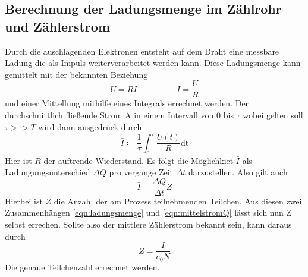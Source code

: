 \subsection{Berechnung der Ladungsmenge im Zählrohr und Zählerstrom}
Durch die auschlagenden Elektronen entsteht auf dem Draht eine messbare Ladung die als Impuls weiterverarbeitet werden kann.
Diese Ladungsmenge kann gemittelt mit der bekannten Beziehung
\begin{equation*}
U=RI \hspace{2cm} I=\frac{U}{R}
\end{equation*}
und einer Mittellung mithilfe eines Integrals errechnet werden.
Der durchschnittlich fließende Strom $\si{\ampere}$ in einem Intervall von $0$ bis $\tau$ wobei gelten soll $\tau>>T$ wird dann ausgedrück durch
\begin{equation}
\label{eqn:ladungsmenge}
\bar{\si{I}} \coloneqq \frac{1}{\tau} \int_{0}^{\tau} \frac{U(t)}{R} \text{dt}
\end{equation}
Hier ist $R$ der auftrende Wiederstand. 
Es folgt die Möglichkiet $\bar{\si{I}}$ als Ladungungsunterschied $\Delta \si{Q}$ pro vergange Zeit $\Delta \si{t}$ darzustellen. 
Also gilt auch
\begin{equation}
\label{eqn:mittelstromQ}
\bar{\si{I}} = \frac{\Delta \si{Q}}{\Delta\si{t}}\si{Z}
\end{equation}  
Hierbei ist $\si{Z}$ die Anzahl der am Prozess teilnehmenden Teilchen.
Aus diesen zwei Zusammenhängen \eqref{eqn:ladungsmenge} und \eqref{eqn:mittelstromQ} lässt sich nun Z selbst errechen. Sollte also der mittlere 
Zählerstrom bekannt sein, kann daraus durch 
\begin{equation}
\label{eqn:teilchen}
\si{Z} = \frac{\si{I}}{e_0N}
\end{equation}
Die genaue Teilchenzahl errechnet werden.

